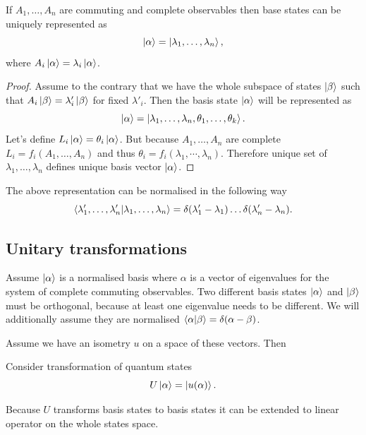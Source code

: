 \documentclass[main.tex]{subfiles}
\begin{document}
\begin{fact}
If $A_1, \dots, A_n$ are commuting and complete observables then base states can be uniquely represented as 
\begin{equation}
\ket{\alpha} = \ket{\lambda_1, \dots, \lambda_n},
\end{equation}
where $A_i \ket{\alpha} = \lambda_i \ket{\alpha}$.  
\end{fact}
\begin{proof}
Assume to the contrary that we have the whole subspace of states $\ket{\beta}$ such that $A_i \ket{\beta} = \lambda'_i \ket{\beta}$ for fixed $\lambda'_i$. Then the basis state $\ket{\alpha}$ will be represented as
\begin{equation}
 \ket{\alpha} = \ket{\lambda_1, \dots, \lambda_n, \theta_1, \dots, \theta_k}.
\end{equation}
Let's define $L_i\ket{\alpha} = \theta_i \ket{\alpha}$. But because $A_1, \dots, A_n$ are complete $L_i = f_i(A_1, \dots, A_n)$ and thus $\theta_i = f_i(\lambda_1, \cdots, \lambda_n)$. Therefore unique set of  $\lambda_1, \dots, \lambda_n$ defines unique basis vector $\ket{\alpha}$.
\end{proof}

The above representation can be normalised in the following way
\begin{equation}
\bra{\lambda'_1, \dots, \lambda'_n}\ket{\lambda_1, \dots, \lambda_n} = \delta(\lambda'_1 - \lambda_1)\dots\delta(\lambda'_n - \lambda_n).
\end{equation}

\subsection{Unitary transformations}
\label{unitary-transformations}
Assume $\ket{\alpha}$ is a normalised basis where $\alpha$ is a vector of eigenvalues for the system of complete commuting observables. Two different basis states $\ket{\alpha}$ and $\ket{\beta}$ must be orthogonal, because at least one eigenvalue needs to be different. We will additionally assume they are normalised $\bra{\alpha}\ket{\beta}= \delta(\alpha - \beta)$. 

Assume we have an isometry $u$ on a space of these vectors. Then 

Consider transformation of quantum states
\begin{equation}
U \ket{\alpha} = \ket{u(\alpha)}.
\end{equation} 

Because $U$ transforms basis states to basis states it can be extended to linear operator on the whole states space.
\end{document}
